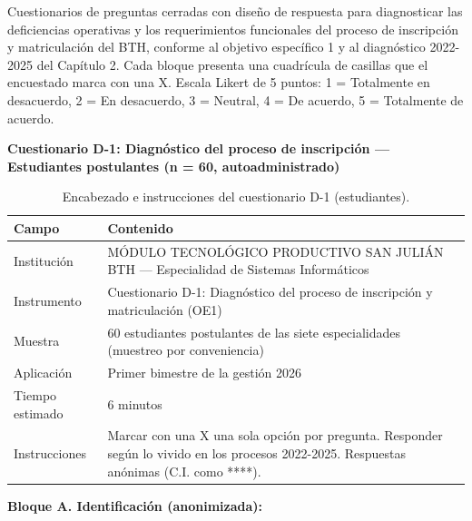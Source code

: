 
\providecommand{\casilla}{\framebox[0.38cm]{\rule{0pt}{0.33cm}}}

Cuestionarios de preguntas cerradas con diseño de respuesta para diagnosticar las deficiencias operativas y los requerimientos funcionales del proceso de inscripción y matriculación del BTH, conforme al objetivo específico 1 y al diagnóstico 2022-2025 del Capítulo 2. Cada bloque presenta una cuadrícula de casillas que el encuestado marca con una X. Escala Likert de 5 puntos: 1 = Totalmente en desacuerdo, 2 = En desacuerdo, 3 = Neutral, 4 = De acuerdo, 5 = Totalmente de acuerdo.

\noindent\textbf{Cuestionario D-1: Diagnóstico del proceso de inscripción --- Estudiantes postulantes (n = 60, autoadministrado)}

\begin{table}[H]
    \centering
    \caption{Encabezado e instrucciones del cuestionario D-1 (estudiantes).}
    \label{tab:d1_encabezado}
    \begin{tabularx}{\textwidth}{p{} X}
        \toprule
        \textbf{Campo} & \textbf{Contenido} \\
        \midrule
        Institución & MÓDULO TECNOLÓGICO PRODUCTIVO SAN JULIÁN BTH --- Especialidad de Sistemas Informáticos \\
        Instrumento & Cuestionario D-1: Diagnóstico del proceso de inscripción y matriculación (OE1) \\
        Muestra & 60 estudiantes postulantes de las siete especialidades (muestreo por conveniencia) \\
        Aplicación & Primer bimestre de la gestión 2026 \\
        Tiempo estimado & 6 minutos \\
        Instrucciones & Marcar con una X una sola opción por pregunta. Responder según lo vivido en los procesos 2022-2025. Respuestas anónimas (C.I. como ****). \\
        \bottomrule
    \end{tabularx}
\end{table}

\Needspace{7cm}
\noindent\textbf{Bloque A. Identificación (anonimizada):}


